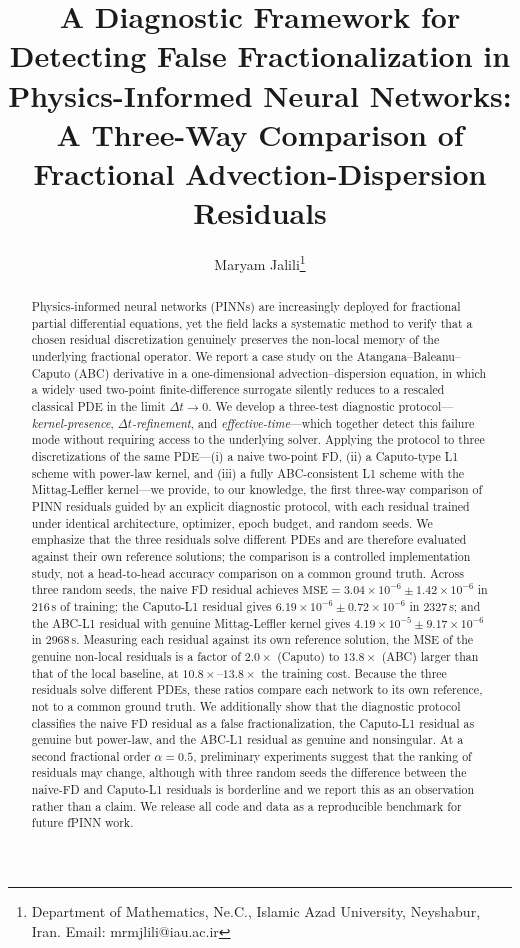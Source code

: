 \documentclass[11pt]{article}
\title{\textbf{A Diagnostic Framework for Detecting False Fractionalization in Physics-Informed Neural Networks: \\ A Three-Way Comparison of Fractional Advection-Dispersion Residuals}}
\author{Maryam Jalili\thanks{Department of Mathematics, Ne.C., Islamic Azad University, Neyshabur, Iran. Email: mrmjlili@iau.ac.ir}}
\date{}
\begin{document}
\maketitle

\begin{abstract}
\noindent
Physics-informed neural networks (PINNs) are increasingly deployed for fractional partial differential equations, yet the field lacks a systematic method to verify that a chosen residual discretization genuinely preserves the non-local memory of the underlying fractional operator. We report a case study on the Atangana--Baleanu--Caputo (ABC) derivative in a one-dimensional advection--dispersion equation, in which a widely used two-point finite-difference surrogate silently reduces to a rescaled classical PDE in the limit \(\Delta t \to 0\). We develop a three-test diagnostic protocol---\emph{kernel-presence}, \emph{\(\Delta t\)-refinement}, and \emph{effective-time}---which together detect this failure mode without requiring access to the underlying solver. Applying the protocol to three discretizations of the same PDE---(i) a naive two-point FD, (ii) a Caputo-type L1 scheme with power-law kernel, and (iii) a fully ABC-consistent L1 scheme with the Mittag-Leffler kernel---we provide, to our knowledge, the first three-way comparison of PINN residuals guided by an explicit diagnostic protocol, with each residual trained under identical architecture, optimizer, epoch budget, and random seeds. We emphasize that the three residuals solve different PDEs and are therefore evaluated against their own reference solutions; the comparison is a controlled implementation study, not a head-to-head accuracy comparison on a common ground truth. Across three random seeds, the naive FD residual achieves \(\mathrm{MSE} = 3.04 \times 10^{-6} \pm 1.42 \times 10^{-6}\) in \(216\)\,s of training; the Caputo-L1 residual gives \(6.19 \times 10^{-6} \pm 0.72 \times 10^{-6}\) in \(2327\)\,s; and the ABC-L1 residual with genuine Mittag-Leffler kernel gives \(4.19 \times 10^{-5} \pm 9.17 \times 10^{-6}\) in \(2968\)\,s. Measuring each residual against its own reference solution, the MSE of the genuine non-local residuals is a factor of \(2.0\times\) (Caputo) to \(13.8\times\) (ABC) larger than that of the local baseline, at \(10.8\times\)--\(13.8\times\) the training cost. Because the three residuals solve different PDEs, these ratios compare each network to its own reference, not to a common ground truth. We additionally show that the diagnostic protocol classifies the naive FD residual as a false fractionalization, the Caputo-L1 residual as genuine but power-law, and the ABC-L1 residual as genuine and nonsingular. At a second fractional order \(\alpha = 0.5\), preliminary experiments suggest that the ranking of residuals may change, although with three random seeds the difference between the naive-FD and Caputo-L1 residuals is borderline and we report this as an observation rather than a claim. We release all code and data as a reproducible benchmark for future fPINN work.


\end{abstract}
\end{document}
